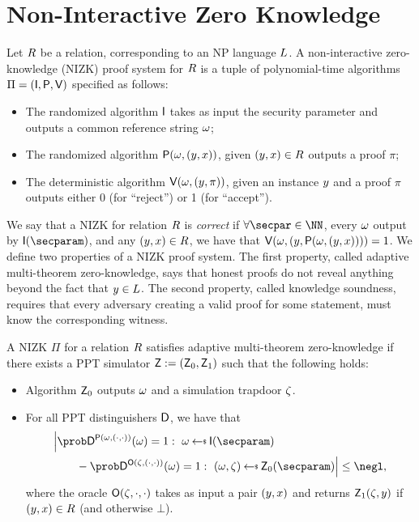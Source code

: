 \section{Non-Interactive Zero Knowledge}\label{sec:nizk}
Let $R$ be a relation, corresponding to an NP language $L$.
A non-interactive zero-knowledge (NIZK) proof system for $R$
is a tuple of polynomial-time algorithms $\Pi = (\mathsf{I}, \mathsf{P}, \mathsf{V})$ specified as follows:
\begin{itemize}
    \item The randomized algorithm $\mathsf{I}$ takes as input the security parameter and outputs a common reference string $\omega$;
    \item The randomized algorithm $\mathsf{P}(\omega,(y,x))$, given $(y,x) \in R$ outputs a proof $\pi$;
    \item The deterministic algorithm $\mathsf{V}(\omega,(y,\pi))$, given an instance $y$ and a proof $\pi$ outputs either 0 (for ``reject'') or 1 (for ``accept'').
\end{itemize}
We say that a NIZK for relation $R$ is {\em correct} if $\forall \secpar\in\NN$, every $\omega$ output by $\init(\secparam)$, and any $(y,x) \in R$, we have that $\mathsf{V}(\omega,(y, \mathsf{P}(\omega, (y,x))))=1$.
\newline\newline
We define two properties of a NIZK proof system.
The first property, called adaptive multi-theorem zero-knowledge, says that honest proofs do not reveal anything beyond the fact that $y\in L$.
The second property, called
knowledge soundness, requires that every adversary creating a valid proof for some statement, must know the corresponding witness.

\begin{definition}\label{def:nizk_zk}
    A NIZK $\Pi$ for a relation $R$ satisfies adaptive multi-theorem zero-knowledge
    if there exists a PPT simulator $\mathsf{Z} := (\mathsf{Z}_0,\mathsf{Z}_1)$ such that the following holds:
    \begin{itemize}
        \item
              Algorithm $\mathsf{Z}_0$ outputs $\omega$ and a simulation trapdoor $\zeta$.
        \item
              For all PPT distinguishers $\mathsf{D}$, we have that
              \begin{align*}
                   & \Big\lvert
                  \Prob{\ddv^{\prover(\crs,(\cdot,\cdot))}(\crs)=1:~\crs\getsr\init(\secparam)}                                 \\
                   & \qquad - \Prob{\ddv^{\advSOracle(\tpsim,(\cdot,\cdot))}(\crs)=1:~(\crs,\tpsim)\getsr\nizksim_0(\secparam)}
                  \Big\rvert \le \negl,
              \end{align*}
              where the oracle $\mathsf{O}(\zeta,\cdot,\cdot)$ takes as input a pair $(y,x)$ and returns $\mathsf{Z}_1(\zeta,y)$ if $(y,x)\in R$ (and otherwise  $\bot$).
    \end{itemize}
\end{definition}

